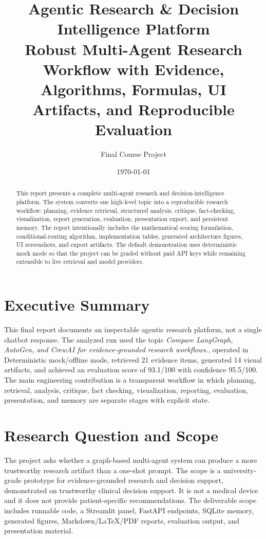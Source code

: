 \documentclass[11pt]{article}
\title{\textbf{Agentic Research \& Decision Intelligence Platform}\\\large Robust Multi-Agent Research Workflow with Evidence, Algorithms, Formulas, UI Artifacts, and Reproducible Evaluation}
\author{Final Course Project}
\date{\today}
\begin{document}
\maketitle

\begin{abstract}
This report presents a complete multi-agent research and decision-intelligence platform. The system converts one high-level topic into a reproducible research workflow: planning, evidence retrieval, structured analysis, critique, fact-checking, visualization, report generation, evaluation, presentation export, and persistent memory. The report intentionally includes the mathematical scoring formulation, conditional-routing algorithm, implementation tables, generated architecture figures, UI screenshots, and export artifacts. The default demonstration uses deterministic mock mode so that the project can be graded without paid API keys while remaining extensible to live retrieval and model providers.
\end{abstract}

\tableofcontents
\listoffigures
\listoftables
\newpage

\section{Executive Summary}
This final report documents an inspectable agentic research platform, not a single chatbot response. The analyzed run used the topic \textit{Compare LangGraph, AutoGen, and CrewAI for evidence-grounded research workflows.}, operated in Deterministic mock/offline mode, retrieved 21 evidence items, generated 14 visual artifacts, and achieved an evaluation score of 93.1/100 with confidence 95.5/100. The main engineering contribution is a transparent workflow in which planning, retrieval, analysis, critique, fact checking, visualization, reporting, evaluation, presentation, and memory are separate stages with explicit state.

\section{Research Question and Scope}
The project asks whether a graph-based multi-agent system can produce a more trustworthy research artifact than a one-shot prompt. The scope is a university-grade prototype for evidence-grounded research and decision support, demonstrated on trustworthy clinical decision support. It is not a medical device and it does not provide patient-specific recommendations. The deliverable scope includes runnable code, a Streamlit panel, FastAPI endpoints, SQLite memory, generated figures, Markdown/LaTeX/PDF reports, evaluation output, and presentation material.
\end{document}
